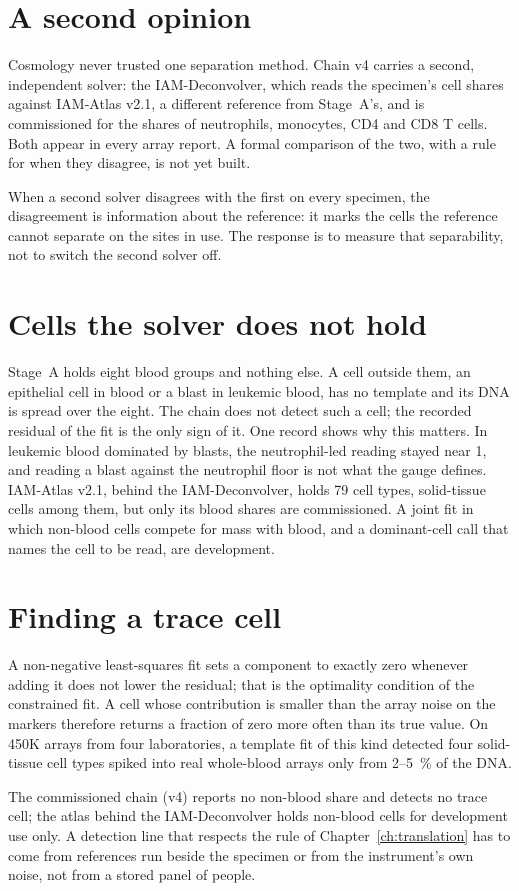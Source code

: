 \section{A second opinion}

Cosmology never trusted one separation method. Chain v4 carries a second, independent solver: the IAM-Deconvolver, which reads the specimen's cell shares against IAM-Atlas v2.1, a different reference from Stage~A's, and is commissioned for the shares of neutrophils, monocytes, CD4 and CD8 T cells. Both appear in every array report. A formal comparison of the two, with a rule for when they disagree, is not yet built. \openprob

When a second solver disagrees with the first on every specimen, the disagreement is information about the reference: it marks the
cells the reference cannot separate on the sites in use. The response is to measure that separability, not to switch the second
solver off. \interp

\section{Cells the solver does not hold}

Stage~A holds eight blood groups and nothing else. A cell outside them, an epithelial cell in blood or a blast in leukemic blood, has no template
and its DNA is spread over the eight. The chain does not detect such a cell; the recorded residual of the fit is the only sign of it. One record
shows why this matters. In leukemic blood dominated by blasts, the neutrophil-led reading stayed near 1, and reading a blast against the neutrophil
floor is not what the gauge defines. \measured{} IAM-Atlas v2.1, behind the IAM-Deconvolver, holds 79 cell types, solid-tissue cells among them, but only its blood shares are commissioned. A joint fit in which non-blood cells compete for mass with blood, and a dominant-cell call that names the cell to be read, are development. \openprob

\section{Finding a trace cell}\label{sec:p4tracecell}

A non-negative least-squares fit sets a component to exactly zero whenever adding it does not lower the residual; that is the
optimality condition of the constrained fit. \derived{} A cell whose contribution is smaller than the array noise on the markers
therefore returns a fraction of zero more often than its true value. On 450K arrays from four laboratories, a template fit of this
kind detected four solid-tissue cell types spiked into real whole-blood arrays only from 2--5~\% of the DNA. \measured

\begin{keybox}[title=Status]
The commissioned chain (v4) reports no non-blood share and detects no trace cell; the atlas behind the IAM-Deconvolver holds non-blood cells for development use only. A detection line that respects the rule of Chapter~\ref{ch:translation}
has to come from references run beside the specimen or from the instrument's own noise, not from a stored panel of people. \openprob
\end{keybox}
